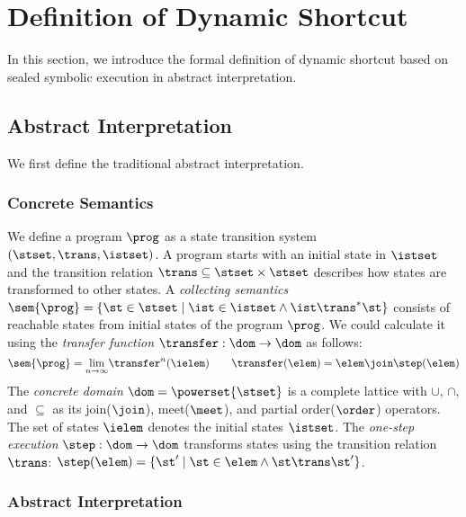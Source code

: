 \section{Definition of Dynamic Shortcut}\label{sec:def}

In this section, we introduce the formal definition of dynamic shortcut based on
sealed symbolic execution in abstract interpretation.



\subsection{Abstract Interpretation}

We first define the traditional abstract interpretation.


\subsubsection{Concrete Semantics}

We define a program $\prog$ as a state transition system $(\stset, \trans,
\istset)$.  A program starts with an initial state in $\istset$ and the
transition relation $\trans \subseteq \stset \times \stset$ describes how states
are transformed to other states.  A \textit{collecting semantics} $\sem{\prog} =
\{ \st \in \stset \mid \ist \in \istset \wedge \ist \trans^* \st \}$ consists of
reachable states from initial states of the program $\prog$.  We could calculate
it using the \textit{transfer function} $\transfer: \dom \rightarrow \dom$ as
follows:
\[
  \sem{\prog} = \underset{n \rightarrow \infty}{\lim}{\transfer^n(\ielem)}\\
  \qquad
  \transfer(\elem) = \elem \join \step(\elem)\\
\]
The \textit{concrete domain} $\dom = \powerset{\stset}$ is a complete lattice
with $\cup$, $\cap$, and $\subseteq$ as its join($\join$), meet($\meet$), and
partial order($\order$) operators.  The set of states $\ielem$ denotes the
initial states $\istset$.  The \textit{one-step execution} $\step: \dom
\rightarrow \dom$ transforms states using the transition relation $\trans$:
$\step(\elem) = \{ \st' \mid \st \in \elem \wedge \st \trans \st' \}$.


\subsubsection{Abstract Interpretation}

